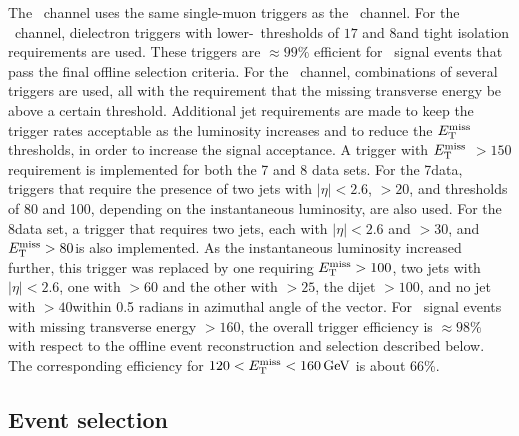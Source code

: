 \documentclass[12pt,twoside,a4paper,cmspaper,final,collab]{cms-tdr}
\begin{document}
The \ZmmH\ channel uses the same single-muon triggers as the \WmnH\ channel.
For the \ZeeH\ channel, dielectron triggers with lower-\PT\
thresholds of $17$ and $8$\GeV  and tight isolation requirements are used.
These triggers are $\approx 99\%$ efficient for  \ZH\  signal events that pass the
final offline selection criteria.  For the \ZnnH\ channel, combinations of several triggers are
used, all with the requirement that the missing transverse energy be
above a certain threshold. Additional jet requirements are made to
keep the trigger rates acceptable as the luminosity increases and to reduce
the $E_{\mathrm{T}}^{\text{miss}}$ thresholds, in order to increase the signal
acceptance.
A trigger with $E_{\mathrm{T}}^{\text{miss}}$ $>150$\GeV requirement  is
implemented for both the 7 and 8\TeV
data sets. For the 7\TeV data, triggers that require the
presence of two jets with $|\eta|<2.6$,  \PT $>20$\GeV, and
\MET thresholds
of 80 and 100\GeV, depending on the instantaneous luminosity, are also used.
For the 8\TeV data set, a trigger that requires two jets,
each with $|\eta| < 2.6$ and \PT $> 30$\GeV, and $E_{\mathrm{T}}^{\text{miss}} > 80$\GeV is
also implemented.  As the instantaneous luminosity
increased further, this trigger was replaced by one
requiring $E_{\mathrm{T}}^{\text{miss}} > 100$\GeV, two jets with $|\eta| < 2.6$, one with \PT $>60$\GeV
and the other with \PT $> 25$\GeV, the dijet \PT $> 100$\GeV,
and no jet with \PT $> 40$\GeV within 0.5 radians in azimuthal angle of the \ETmiss vector.
For \ZnnH\ signal events with
missing transverse energy $>160$\GeV, the overall
trigger efficiency is $\approx 98\%$ with
respect to the offline event reconstruction and selection described
below. The corresponding efficiency for $120< E_{\mathrm{T}}^{\text{miss}} < 160\,\text{Ge\hspace{-.08em}V}$ is about 66\%.






\subsection{Event selection}\label{sssec:hbb_Event_Selection}
\end{document}
